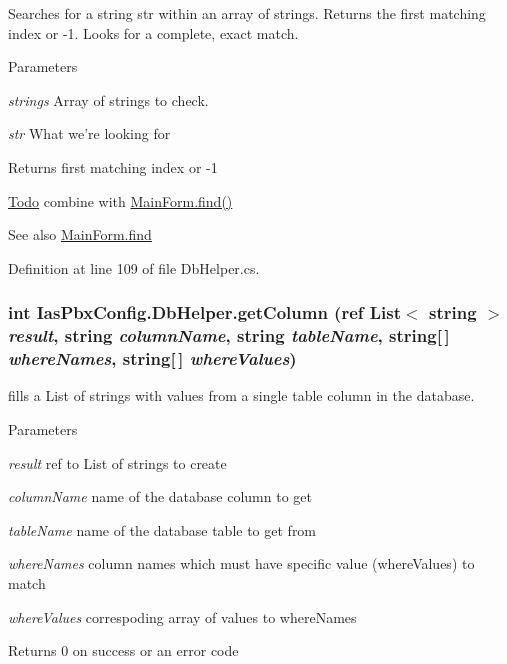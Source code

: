 Searches for a string str within an array of strings. Returns the first matching index or -\/1. Looks for a complete, exact match. 
\begin{DoxyParams}{Parameters}
\item[{\em strings}]Array of strings to check. \item[{\em str}]What we're looking for \end{DoxyParams}
\begin{DoxyReturn}{Returns}
first matching index or -\/1
\end{DoxyReturn}
\begin{Desc}
\item[\hyperlink{todo__todo000014}{Todo}]combine with \hyperlink{class_ias_pbx_config_1_1_main_form_a2a8635cccbee2889edeca0ad76095e34}{MainForm.find()} \end{Desc}
\begin{DoxySeeAlso}{See also}
\hyperlink{class_ias_pbx_config_1_1_main_form_a2a8635cccbee2889edeca0ad76095e34}{MainForm.find} 
\end{DoxySeeAlso}


Definition at line 109 of file DbHelper.cs.\hypertarget{class_ias_pbx_config_1_1_db_helper_a8f01f867cfceb3fbfc8f8c1e1aff8071}{
\subsubsection[{getColumn}]{\setlength{\rightskip}{0pt plus 5cm}int IasPbxConfig.DbHelper.getColumn (ref List$<$ string $>$ {\em result}, \/  string {\em columnName}, \/  string {\em tableName}, \/  string\mbox{[}$\,$\mbox{]} {\em whereNames}, \/  string\mbox{[}$\,$\mbox{]} {\em whereValues})}}
\label{class_ias_pbx_config_1_1_db_helper_a8f01f867cfceb3fbfc8f8c1e1aff8071}


fills a List of strings with values from a single table column in the database. 
\begin{DoxyParams}{Parameters}
\item[{\em result}]ref to List of strings to create \item[{\em columnName}]name of the database column to get \item[{\em tableName}]name of the database table to get from \item[{\em whereNames}]column names which must have specific value (whereValues) to match \item[{\em whereValues}]correspoding array of values to whereNames \end{DoxyParams}
\begin{DoxyReturn}{Returns}
0 on success or an error code 
\end{DoxyReturn}


